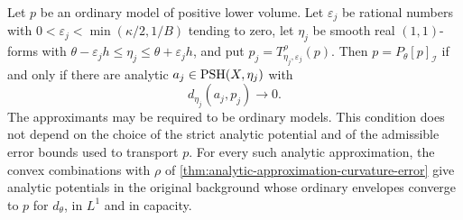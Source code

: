 \enlargethispage{2\baselineskip}
\begin{theorem}\label{thm:two-sided-analytic-criterion}
Let $p$ be an ordinary model of positive lower volume. Let $\varepsilon_j$ be rational numbers with $0<\varepsilon_j<\min(\kappa/2,1/B)$ tending to zero, let $\eta_j$ be smooth real $(1,1)$-forms with $\theta-\varepsilon_jh\leq\eta_j\leq\theta+\varepsilon_jh$, and put $p_j=T^\rho_{\eta_j,\varepsilon_j}(p)$. Then $p=P_\theta[p]_{\mathcal I}$ if and only if there are analytic $a_j\in\mathrm{PSH}(X,\eta_j)$ with
\[
 d_{\eta_j}(a_j,p_j)\longrightarrow0.
\]
The approximants may be required to be ordinary models. This condition does not depend on the choice of the strict analytic potential and of the admissible error bounds used to transport $p$. For every such analytic approximation, the convex combinations with $\rho$ of \cref{thm:analytic-approximation-curvature-error} give analytic potentials in the original background whose ordinary envelopes converge to $p$ for $d_\theta$, in $L^1$ and in capacity.
\end{theorem}
